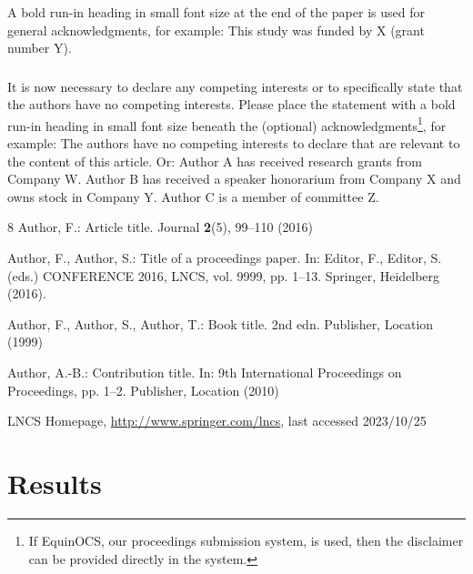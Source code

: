 \documentclass[runningheads]{llncs}
\begin{document}
\begin{credits}
\subsubsection{\ackname} A bold run-in heading in small font size at the end of the paper is
used for general acknowledgments, for example: This study was funded
by X (grant number Y).

\subsubsection{\discintname}
It is now necessary to declare any competing interests or to specifically
state that the authors have no competing interests. Please place the
statement with a bold run-in heading in small font size beneath the
(optional) acknowledgments\footnote{If EquinOCS, our proceedings submission
system, is used, then the disclaimer can be provided directly in the system.},
for example: The authors have no competing interests to declare that are
relevant to the content of this article. Or: Author A has received research
grants from Company W. Author B has received a speaker honorarium from
Company X and owns stock in Company Y. Author C is a member of committee Z.
\end{credits}
%
%
%
% 
% 
%
\begin{thebibliography}{8}
Author, F.: Article title. Journal \textbf{2}(5), 99--110 (2016)

Author, F., Author, S.: Title of a proceedings paper. In: Editor,
F., Editor, S. (eds.) CONFERENCE 2016, LNCS, vol. 9999, pp. 1--13.
Springer, Heidelberg (2016). 

Author, F., Author, S., Author, T.: Book title. 2nd edn. Publisher,
Location (1999)

Author, A.-B.: Contribution title. In: 9th International Proceedings
on Proceedings, pp. 1--2. Publisher, Location (2010)

LNCS Homepage, \url{http://www.springer.com/lncs}, last accessed 2023/10/25
\end{thebibliography}



\section{Results}
\end{document}
